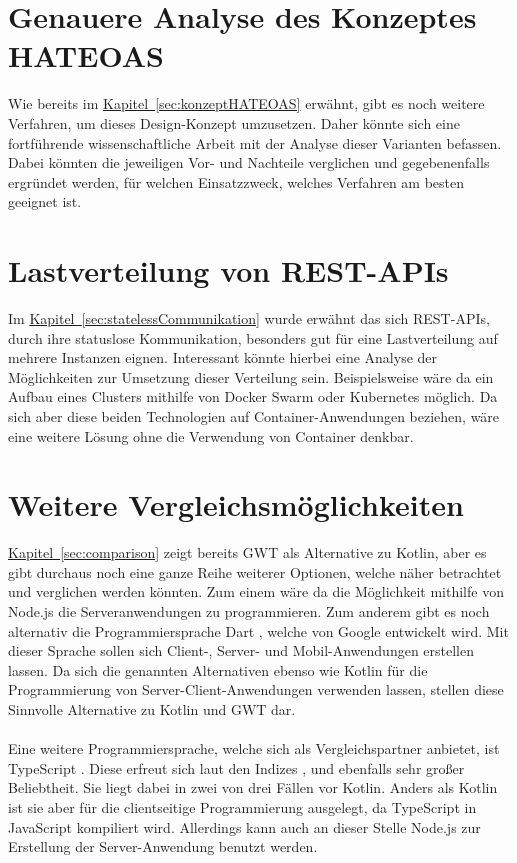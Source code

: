 \section{Genauere Analyse des Konzeptes HATEOAS}
Wie bereits im \hyperref[sec:konzeptHATEOAS]{Kapitel~\ref{sec:konzeptHATEOAS}} erwähnt, gibt es noch weitere Verfahren, um dieses Design-Konzept umzusetzen. Daher könnte sich eine fortführende wissenschaftliche Arbeit mit der Analyse dieser Varianten befassen. Dabei könnten die jeweiligen Vor- und Nachteile verglichen und gegebenenfalls ergründet werden, für welchen Einsatzzweck, welches Verfahren am besten geeignet ist.

\section{Lastverteilung von REST-APIs}
Im \hyperref[sec:statelessCommunikation]{Kapitel~\ref{sec:statelessCommunikation}} wurde erwähnt das sich \gls{REST}-\glspl{API}, durch ihre statuslose Kommunikation, besonders gut für eine Lastverteilung auf mehrere Instanzen eignen. Interessant könnte hierbei eine Analyse der Möglichkeiten zur Umsetzung dieser Verteilung sein. Beispielsweise wäre da ein Aufbau eines Clusters mithilfe von Docker Swarm oder Kubernetes möglich. Da sich aber diese beiden Technologien auf Container-Anwendungen beziehen, wäre eine weitere Lösung ohne die Verwendung von Container denkbar.

\section{Weitere Vergleichsmöglichkeiten}
\hyperref[sec:comparison]{Kapitel~\ref{sec:comparison}} zeigt bereits \gls{GWT} als Alternative zu Kotlin, aber es gibt durchaus noch eine ganze Reihe weiterer Optionen, welche näher betrachtet und verglichen werden könnten. Zum einem wäre da die Möglichkeit mithilfe von Node.js \cite{nodeJs} die Serveranwendungen zu programmieren. Zum anderem gibt es noch alternativ die Programmiersprache Dart \cite{dart}, welche von Google entwickelt wird. Mit dieser Sprache sollen sich Client-, Server- und Mobil-Anwendungen erstellen lassen. Da sich die genannten Alternativen ebenso wie Kotlin für die Programmierung von Server-Client-Anwendungen verwenden lassen, stellen diese Sinnvolle Alternative zu Kotlin und \gls{GWT} dar.\\
\\
Eine weitere Programmiersprache, welche sich als Vergleichspartner anbietet, ist TypeScript \cite{typeScript}. Diese erfreut sich laut den Indizes \cite{tiobeIndex}, \cite{redMonkIndex} und \cite{pyplIndex} ebenfalls sehr großer Beliebtheit. Sie liegt dabei in zwei von drei Fällen vor Kotlin. Anders als Kotlin ist sie aber für die clientseitige Programmierung ausgelegt, da TypeScript in JavaScript kompiliert wird. Allerdings kann auch an dieser Stelle Node.js zur Erstellung der Server-Anwendung benutzt werden.